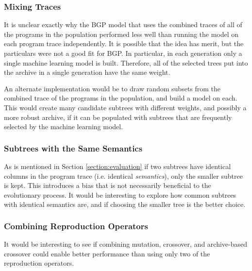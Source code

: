 \subsubsection{Mixing Traces}
It is unclear exactly why the BGP model that uses the combined traces of all of the programs in the population performed less well than running the model on each program trace independently.  It is possible that the idea has merit, but the particulars were not a good fit for BGP.  In particular, in each generation only a single machine learning model is built.  Therefore, all of the selected trees put into the archive in a single generation have the same weight.

An alternate implementation would be to draw random subsets from the combined trace of the programs in the population, and build a model on each.  This would create many candidate subtrees with different weights, and possibly a more robust archive, if it can be populated with subtrees that are frequently selected by the machine learning model.

\subsubsection{Subtrees with the Same Semantics}
As is mentioned in Section \ref{section:evaluation} if two subtrees have identical columns in the program trace (i.e. identical \textit{semantics}), only the smaller subtree is kept.  This introduces a bias that is not necessarily beneficial to the evolutionary process.  It would be interesting to explore how common subtrees with identical semantics are, and if choosing the smaller tree is the better choice.

\subsubsection{Combining Reproduction Operators}
It would be interesting to see if combining mutation, crossover, and archive-based crossover could enable better performance than using only two of the reproduction operators.

%

